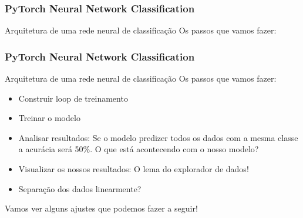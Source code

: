 \documentclass{beamer}
\begin{document}
\begin{frame}
	\frametitle{PyTorch Neural Network Classification}
	\begin{block}{Arquitetura de uma rede neural de classificação}
		Os passos que vamos fazer:
		\begin{table}[]
		\end{table}
	\end{block}
\end{frame}
\begin{frame}
	\frametitle{PyTorch Neural Network Classification}
	\begin{block}{Arquitetura de uma rede neural de classificação}
		Os passos que vamos fazer:
		\begin{itemize}
			\item Construir loop de treinamento
			\item Treinar o modelo 
			\item Analisar resultados: Se o modelo predizer todos os dados com a mesma classe a acurácia será 50\%. O que está acontecendo com o nosso modelo?
			\item Visualizar os nossos resultados: O lema do explorador de dados!
			\item Separação dos dados linearmente?
		\end{itemize}
	Vamos ver alguns ajustes que podemos fazer a seguir!
	\end{block}
\end{frame}
\end{document}
